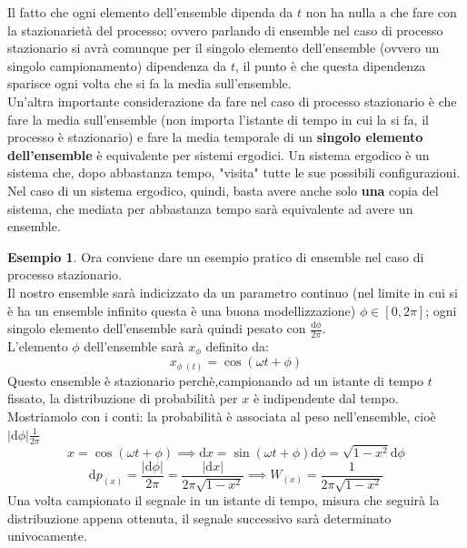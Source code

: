 \documentclass[a4paper,12pt]{article}
\renewcommand{\arg}[1]{_{(#1)}}
\theoremstyle{plain}
\theoremstyle{definition}
\newtheorem{exmp}{Esempio}[section]
\newcommand{\f}[2]{\frac{#1}{#2}}
\renewcommand{\d}{\text{d}}
\theoremstyle{remark}
\begin{document}
\begin{obs}
	Il fatto che ogni elemento dell'ensemble dipenda da $t$ non ha nulla a che fare con la stazionarietà del processo; ovvero parlando di ensemble nel caso di processo stazionario si avrà comunque per il singolo elemento dell'ensemble (ovvero un singolo campionamento) dipendenza da $t$, il punto è che questa dipendenza sparisce ogni volta che si fa la media sull'ensemble. 
	\\Un'altra importante considerazione da fare nel caso di processo stazionario è che fare la media sull'ensemble (non importa l'istante di tempo in cui la si fa, il processo è stazionario) e fare la media temporale di un \textbf{singolo elemento dell'ensemble} è equivalente per sistemi ergodici. Un sistema ergodico è un sistema che, dopo abbastanza tempo, "visita" tutte le sue possibili configurazioni. Nel caso di un sistema ergodico, quindi, basta avere anche solo \textbf{una} copia del sistema, che mediata per abbastanza tempo sarà equivalente ad avere un ensemble.
\end{obs}
\begin{exmp}
	Ora conviene dare un esempio pratico di ensemble nel caso di processo stazionario. 
	\\Il nostro ensemble sarà indicizzato da un parametro continuo (nel limite in cui si è ha un ensemble infinito questa è una buona modellizzazione) $\phi\in[0,2\pi]$; ogni singolo elemento dell'ensemble sarà quindi pesato con  $\f{\d \phi}{2\pi}$. 
	\\L'elemento $\phi$ dell'ensemble sarà $x_\phi$  definito da:
	\[x_{\phi\:(t)}=\cos(\omega t+\phi)		\]
	Questo ensemble è stazionario perchè,campionando ad un istante di tempo $t$ fissato, la distribuzione di probabilità per $x$ è indipendente dal tempo. \\
	Mostriamolo con i conti: la probabilità è associata al peso nell'ensemble, cioè $|\d \phi| \frac{1}{2\pi}$
	\[x=\cos(\omega t+\phi)	\implies\d x= \sin(\omega t +\phi)\d \phi=\sqrt{1-x^2}\d \phi	\]
	\[\d p\arg{x}= \frac{|\d \phi|}{2\pi}=\frac{|\d x|}{2\pi \sqrt{1-x^2}}\implies W\arg{x}=\f{1}{2\pi \sqrt{1-x^2}}\]
	Una volta campionato il segnale in un istante di tempo, misura che seguirà la distribuzione appena ottenuta, il segnale successivo sarà determinato  univocamente.
\end{exmp}
\end{document}
